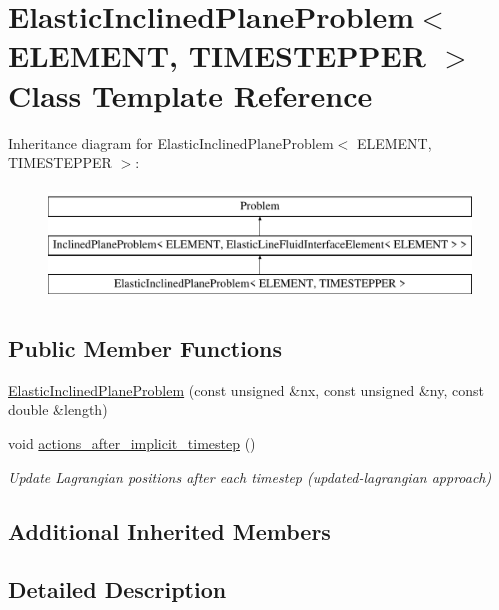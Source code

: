 \hypertarget{classElasticInclinedPlaneProblem}{}\section{Elastic\+Inclined\+Plane\+Problem$<$ E\+L\+E\+M\+E\+NT, T\+I\+M\+E\+S\+T\+E\+P\+P\+ER $>$ Class Template Reference}
\label{classElasticInclinedPlaneProblem}
Inheritance diagram for Elastic\+Inclined\+Plane\+Problem$<$ E\+L\+E\+M\+E\+NT, T\+I\+M\+E\+S\+T\+E\+P\+P\+ER $>$\+:\begin{figure}[H]
\begin{center}
\leavevmode
\includegraphics[height=3.000000cm]{classElasticInclinedPlaneProblem}
\end{center}
\end{figure}
\subsection*{Public Member Functions}
\begin{DoxyCompactItemize}
\item 
\hyperlink{classElasticInclinedPlaneProblem_a5006b73d91fcb4bd20d0591577e50f61}{Elastic\+Inclined\+Plane\+Problem} (const unsigned \&nx, const unsigned \&ny, const double \&length)
\item 
void \hyperlink{classElasticInclinedPlaneProblem_a7e61d0cb5e10b7e98f949a43749477a6}{actions\+\_\+after\+\_\+implicit\+\_\+timestep} ()
\begin{DoxyCompactList}\small\item\em Update Lagrangian positions after each timestep (updated-\/lagrangian approach) \end{DoxyCompactList}\end{DoxyCompactItemize}
\subsection*{Additional Inherited Members}


\subsection{Detailed Description}
